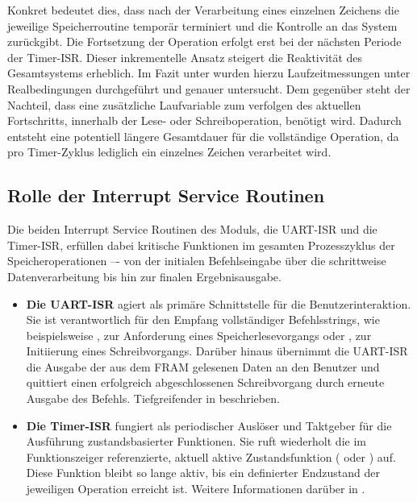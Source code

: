 Konkret bedeutet dies, dass nach der Verarbeitung eines einzelnen Zeichens die jeweilige Speicherroutine tempor\"ar terminiert und die Kontrolle an das System zur\"uckgibt. Die Fortsetzung der Operation erfolgt erst bei der n\"achsten Periode der Timer-ISR. Dieser inkrementelle Ansatz steigert die Reaktivit\"at des Gesamtsystems erheblich. Im Fazit unter  wurden hierzu Laufzeitmessungen unter Realbedingungen durchgef\"uhrt und genauer untersucht. Dem gegen\"uber steht der Nachteil, dass eine zus\"atzliche Laufvariable zum verfolgen des aktuellen Fortschritts, innerhalb der Lese- oder Schreiboperation, ben\"otigt wird. Dadurch entsteht eine potentiell l\"angere Gesamtdauer f\"ur die vollst\"andige Operation, da pro Timer-Zyklus lediglich ein einzelnes Zeichen verarbeitet wird.\AI


\subsection{Rolle der Interrupt Service Routinen}
\label{sec:LesenSchreiben_Rolle_ISR}

Die beiden Interrupt Service Routinen des Moduls, die UART-ISR und die Timer-ISR, erf\"ullen dabei kritische Funktionen im gesamten Prozesszyklus der Speicheroperationen –- von der initialen Befehlseingabe \"uber die schrittweise Datenverarbeitung bis hin zur finalen Ergebnisausgabe.

\begin{itemize}
	\item \textbf{Die UART-ISR} agiert als prim\"are Schnittstelle f\"ur die Benutzerinteraktion. Sie ist verantwortlich f\"ur den Empfang vollst\"andiger Befehlsstrings, wie beispielsweise \glqq{}\grqq{}, zur Anforderung eines Speicherlesevorgangs oder \glqq{}\grqq{}, zur Initiierung eines Schreibvorgangs. Dar\"uber hinaus \"ubernimmt die UART-ISR die Ausgabe der aus dem FRAM gelesenen Daten an den Benutzer und quittiert einen erfolgreich abgeschlossenen Schreibvorgang durch erneute Ausgabe des Befehls. Tiefgreifender in  beschrieben.
	
	\item \textbf{Die Timer-ISR} fungiert als periodischer Ausl\"oser und Taktgeber f\"ur die Ausf\"uhrung zustandsbasierter Funktionen. Sie ruft wiederholt die im Funktionszeiger  referenzierte, aktuell aktive Zustandsfunktion (\zB {} oder ) auf. Diese Funktion bleibt so lange aktiv, bis ein definierter Endzustand der jeweiligen Operation erreicht ist. Weitere Informationen dar\"uber in .
\end{itemize}

